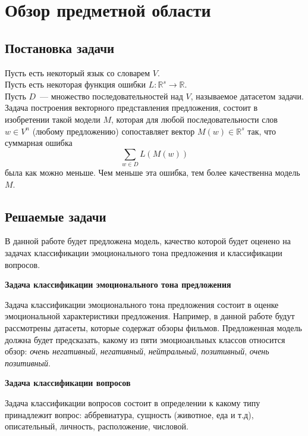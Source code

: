 
\chapter{Обзор предметной области}

\section{Постановка задачи}
\noindent Пусть есть некоторый язык со словарем $V$.\\
Пусть есть некоторая функция ошибки $L:\mathbb{R}^s \to \mathbb{R}$.\\
Пусть $D$~--- множество последовательностей над $V$, называемое датасетом задачи.\\
Задача построения векторного представления предложения, состоит в изобретении такой модели $M$, 
которая для любой последовательности слов $w \in V^n$ (любому предложению) сопоставляет
вектор $M(w) \in \mathbb{R}^s$ так, что суммарная ошибка $$\sum_{w \in D} L(M(w))$$ была как можно меньше.
Чем меньше эта ошибка, тем более качественна модель $M$.\\

\section{Решаемые задачи}
В данной работе будет предложена модель, качество которой будет оценено на задачах классификации эмоционального тона предложения и классификации вопросов.
\vspace{5mm}

\noindent \textbf{Задача классификации эмоционального тона предложения}\par
Задача классификации эмоционального тона предложения состоит в оценке эмоциональной характеристики предложения. Например, в данной работе будут рассмотрены датасеты, которые содержат обзоры фильмов. Предложенная модель должна будет предсказать, какому из пяти эмоциоанльных классов относится обзор:
\emph{очень негативный}, \emph{негативный}, \emph{нейтральный}, \emph{позитивный}, \emph{очень позитивный}.
\vspace{5mm}

\noindent \textbf{Задача классификации вопросов}\par
Задача классификации вопросов состоит в определении к какому типу принадлежит вопрос:
аббревиатура, сущность (животное, еда и т.д), описательный, личность, расположение, числовой.

